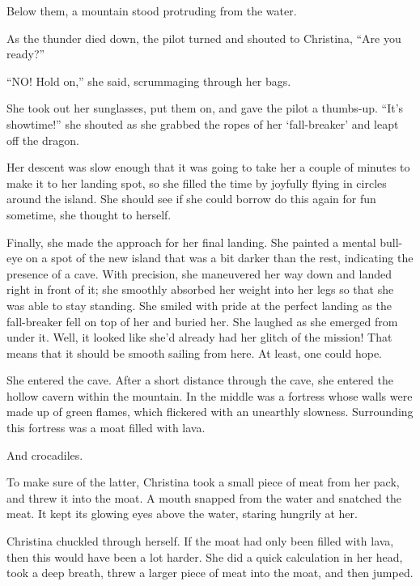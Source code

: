 \documentclass[showtrims,b6paper,draft,10pt]{memoir}
\begin{document}
Below them, a mountain stood protruding from the water.

As the thunder died down, the pilot turned and shouted to Christina,  ``Are you ready?''

``NO!  Hold on,'' she said, scrummaging through her bags.

She took out her sunglasses, put them on, and gave the pilot a thumbs-up.  ``It's showtime!'' she shouted as she grabbed the ropes of her `fall-breaker' and leapt off the dragon.

Her descent was slow enough that it was going to take her a couple of minutes to make it to her landing spot, so she filled the time by joyfully flying in circles around the island.  She should see if she could borrow do this again for fun sometime, she thought to herself.

Finally, she made the approach for her final landing.  She painted a mental bull-eye on a spot of the new island that was a bit darker than the rest, indicating the presence of a cave.  With precision, she maneuvered her way down and landed right in front of it;  she smoothly absorbed her weight into her legs so that she was able to stay standing.  She smiled with pride at the perfect landing as the fall-breaker fell on top of her and buried her.  She laughed as she emerged from under it.  Well, it looked like she'd already had her glitch of the mission!  That means that it should be smooth sailing from here.  At least, one could hope.

She entered the cave.
After a short distance through the cave, she entered the hollow cavern within the mountain.  In the middle was a fortress whose walls were made up of green flames, which flickered with an unearthly slowness.  Surrounding this fortress was a moat filled with lava.

And crocadiles.

To make sure of the latter, Christina took a small piece of meat from her pack, and threw it into the moat.  A mouth snapped from the water and snatched the meat.  It kept its glowing eyes above the water, staring hungrily at her.

Christina chuckled through herself.  If the moat had only been filled with lava, then this would have been a lot harder.  She did a quick calculation in her head, took a deep breath, threw a larger piece of meat into the moat, and then jumped.
\end{document}
